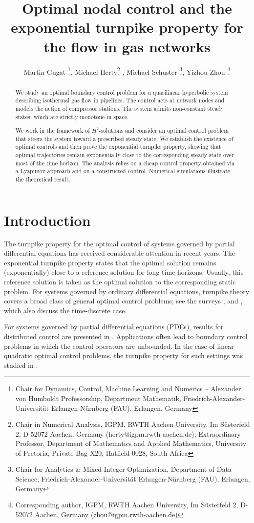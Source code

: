 \documentclass[12pt]{article}
\title{Optimal nodal control and the exponential turnpike property for the flow in gas networks}
\author{Martin Gugat \thanks{Chair for Dynamics, Control, Machine Learning and Numerics – Alexander von Humboldt Professorship, Department Mathematik, Friedrich-Alexander-Universität Erlangen-Nürnberg (FAU), Erlangen, Germany}, 
Michael Herty\thanks{Chair in Numerical Analysis, IGPM, RWTH Aachen University, Im Süsterfeld 2, D-52072 Aachen, Germany (herty@igpm.rwth-aachen.de); Extraordinary Professor, Department of Mathematics and Applied Mathematics, University of Pretoria, Private Bag X20, Hatfield 0028, South Africa} , Michael Schuster \thanks{Chair for Analytics \& Mixed-Integer Optimization, Department of Data Science, Friedrich-Alexander-Universität Erlangen-Nürnberg (FAU), Erlangen, Germany}, 
Yizhou Zhou \thanks{Corresponding author, IGPM, RWTH Aachen University, Im Süsterfeld 2, D-52072 Aachen, Germany (zhou@igpm.rwth-aachen.de)}}
\date{}
\numberwithin{equation}{section}
\begin{document}
\maketitle{}

\begin{abstract}
We study an optimal boundary control problem for a quasilinear hyperbolic system describing isothermal gas flow in pipelines. The control acts at network nodes and models the action of compressor stations. The system admits non-constant steady states, which are strictly monotone in space.

We work in the framework of $H^2$-solutions and consider an optimal control problem that steers the system toward a prescribed steady state. We  establish the existence of optimal controls and then prove the exponential turnpike property, showing that optimal trajectories remain exponentially close to the corresponding steady state over most of the time horizon.
The analysis relies on a cheap control property obtained via a Lyapunov approach and on a constructed control. Numerical simulations illustrate the theoretical result.
\end{abstract}



\section{Introduction}


The turnpike property for the optimal control of systems governed by partial differential equations has received considerable attention in recent years. 
The exponential turnpike property states that the optimal solution remains (exponentially) close to a reference solution for long time horizons. Usually, this reference solution is taken as the optimal solution to the corresponding static problem. 
For systems governed by ordinary differential equations, turnpike theory covers a broad class of general optimal control problems; see the surveys 
\cite{trelat2025turnpike},
and 
\cite{faulwasser2022turnpike, faulwasser2017turnpike}, which also discuss the time-discrete case. 

For systems governed by partial differential equations (PDEs),
results for distributed control are presented in \cite{porretta2013long}.
Applications often lead to boundary control problems in which the control operators are unbounded. In the case of linear--quadratic optimal control problems, the turnpike property for such settings was studied in 
\cite{nguyen2026turnpike, gugat2019turnpike, gugat2016optimal}.
\end{document}
